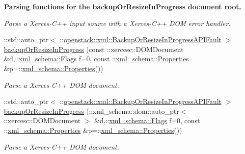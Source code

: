 \begin{Indent}{\bf Parsing functions for the backupOrResizeInProgress document root.}
\begin{DoxyCompactItemize}
\begin{DoxyCompactList}\small\item\em Parse a Xerces-\/C++ input source with a Xerces-\/C++ DOM error handler. \item\end{DoxyCompactList}\item 
::std::auto\_\-ptr$<$ ::\hyperlink{classopenstack_1_1xml_1_1BackupOrResizeInProgressAPIFault}{openstack::xml::BackupOrResizeInProgressAPIFault} $>$ \hyperlink{namespaceopenstack_1_1xml_a375a131aa43849d234d55921e454a97d}{backupOrResizeInProgress} (const ::xercesc::DOMDocument \&d,::\hyperlink{namespacexml__schema_affb4c227cbd9aa7453dd1dc5a1401943}{xml\_\-schema::Flags} f=0, const ::\hyperlink{namespacexml__schema_ad27ce19a7ee1d3b1064092648898f64c}{xml\_\-schema::Properties} \&p=::\hyperlink{namespacexml__schema_ad27ce19a7ee1d3b1064092648898f64c}{xml\_\-schema::Properties}())
\begin{DoxyCompactList}\small\item\em Parse a Xerces-\/C++ DOM document. \item\end{DoxyCompactList}\item 
::std::auto\_\-ptr$<$ ::\hyperlink{classopenstack_1_1xml_1_1BackupOrResizeInProgressAPIFault}{openstack::xml::BackupOrResizeInProgressAPIFault} $>$ \hyperlink{namespaceopenstack_1_1xml_a5ff125a7660ff1447d9d3f031e026a5f}{backupOrResizeInProgress} (::xml\_\-schema::dom::auto\_\-ptr$<$ ::xercesc::DOMDocument $>$ \&d,::\hyperlink{namespacexml__schema_affb4c227cbd9aa7453dd1dc5a1401943}{xml\_\-schema::Flags} f=0, const ::\hyperlink{namespacexml__schema_ad27ce19a7ee1d3b1064092648898f64c}{xml\_\-schema::Properties} \&p=::\hyperlink{namespacexml__schema_ad27ce19a7ee1d3b1064092648898f64c}{xml\_\-schema::Properties}())
\begin{DoxyCompactList}\small\item\em Parse a Xerces-\/C++ DOM document. \item\end{DoxyCompactList}\end{DoxyCompactItemize}
\end{Indent}

